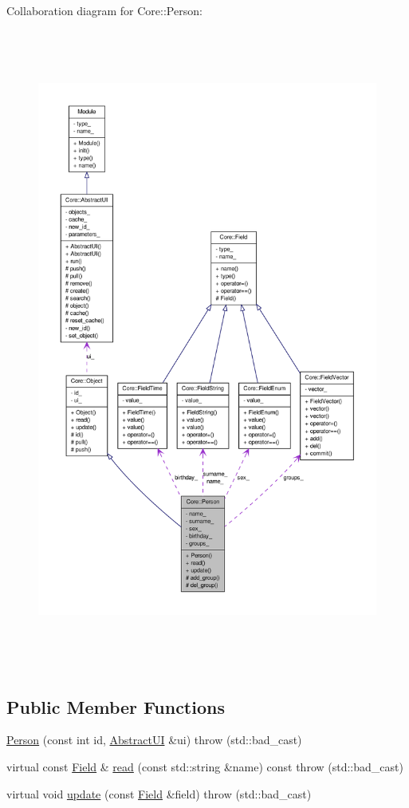 Collaboration diagram for Core::Person:
\nopagebreak
\begin{figure}[H]
\begin{center}
\leavevmode
\includegraphics[height=600pt]{dc/d29/classCore_1_1Person__coll__graph}
\end{center}
\end{figure}
\subsection*{Public Member Functions}
\begin{DoxyCompactItemize}
\item 
\hyperlink{classCore_1_1Person_a9405c941c475f698a34ad5553fe78dd0}{Person} (const int id, \hyperlink{classCore_1_1AbstractUI}{AbstractUI} \&ui)  throw (std::bad\_\-cast)
\item 
virtual const \hyperlink{classCore_1_1Field}{Field} \& \hyperlink{classCore_1_1Person_ab17943dd393e593ed5f79773648fe9eb}{read} (const std::string \&name) const   throw (std::bad\_\-cast)
\item 
virtual void \hyperlink{classCore_1_1Person_ad0a922103a6271dac4816c333d0b9e65}{update} (const \hyperlink{classCore_1_1Field}{Field} \&field)  throw (std::bad\_\-cast)
\end{DoxyCompactItemize}

